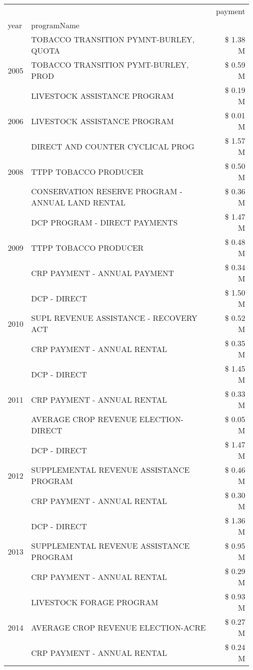 \begin{tabular}{llr}
\toprule
 &  & payment \\
year & programName &  \\
\midrule
\multirow[t]{3}{*}{2005} & TOBACCO TRANSITION PYMNT-BURLEY, QUOTA & \$ 1.38 M \\
 & TOBACCO TRANSITION PYMT-BURLEY, PROD & \$ 0.59 M \\
 & LIVESTOCK ASSISTANCE PROGRAM & \$ 0.19 M \\
\cline{1-3}
2006 & LIVESTOCK ASSISTANCE PROGRAM & \$ 0.01 M \\
\cline{1-3}
\multirow[t]{3}{*}{2008} & DIRECT AND COUNTER CYCLICAL PROG & \$ 1.57 M \\
 & TTPP TOBACCO PRODUCER & \$ 0.50 M \\
 & CONSERVATION RESERVE PROGRAM - ANNUAL LAND RENTAL & \$ 0.36 M \\
\cline{1-3}
\multirow[t]{3}{*}{2009} & DCP PROGRAM - DIRECT PAYMENTS & \$ 1.47 M \\
 & TTPP TOBACCO PRODUCER & \$ 0.48 M \\
 & CRP PAYMENT - ANNUAL PAYMENT & \$ 0.34 M \\
\cline{1-3}
\multirow[t]{3}{*}{2010} & DCP - DIRECT & \$ 1.50 M \\
 & SUPL REVENUE ASSISTANCE - RECOVERY ACT & \$ 0.52 M \\
 & CRP PAYMENT - ANNUAL RENTAL & \$ 0.35 M \\
\cline{1-3}
\multirow[t]{3}{*}{2011} & DCP - DIRECT & \$ 1.45 M \\
 & CRP PAYMENT - ANNUAL RENTAL & \$ 0.33 M \\
 & AVERAGE CROP REVENUE ELECTION-DIRECT & \$ 0.05 M \\
\cline{1-3}
\multirow[t]{3}{*}{2012} & DCP - DIRECT & \$ 1.47 M \\
 & SUPPLEMENTAL REVENUE ASSISTANCE PROGRAM & \$ 0.46 M \\
 & CRP PAYMENT - ANNUAL RENTAL & \$ 0.30 M \\
\cline{1-3}
\multirow[t]{3}{*}{2013} & DCP - DIRECT & \$ 1.36 M \\
 & SUPPLEMENTAL REVENUE ASSISTANCE PROGRAM & \$ 0.95 M \\
 & CRP PAYMENT - ANNUAL RENTAL & \$ 0.29 M \\
\cline{1-3}
\multirow[t]{3}{*}{2014} & LIVESTOCK FORAGE PROGRAM & \$ 0.93 M \\
 & AVERAGE CROP REVENUE ELECTION-ACRE & \$ 0.27 M \\
 & CRP PAYMENT - ANNUAL RENTAL & \$ 0.24 M \\

\end{tabular}
